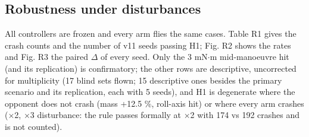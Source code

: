 \documentclass[10pt,a4paper]{article}
\begin{document}
\subsection{Robustness under disturbances}

All controllers are frozen and every arm flies the same cases. Table R1 gives the crash counts and the number of v11 seeds passing H1; Fig. R2 shows the rates and Fig. R3 the paired $\Delta$ of every seed. Only the 3 mN$\cdot$m mid-manoeuvre hit (and its replication) is confirmatory; the other rows are descriptive, uncorrected for multiplicity (17 blind sets flown; 15 descriptive ones besides the primary scenario and its replication, each with 5 seeds), and H1 is degenerate where the opponent does not crash (mass +12.5 \%, roll-axis hit) or where every arm crashes ($\times$2, $\times$3 disturbance: the rule passes formally at $\times$2 with 174 vs 192 crashes and is not counted).
\end{document}
